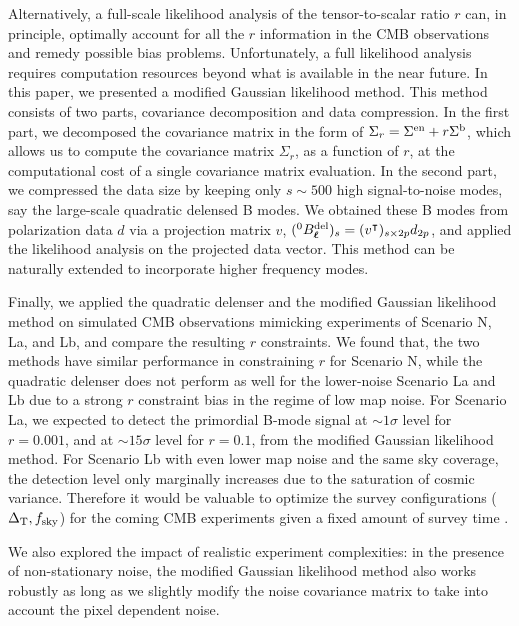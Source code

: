 \documentclass[iop,apj, numberedappendix]{emulateapj}
\newcommand*\Bell{\ensuremath{\boldsymbol\ell}}
\begin{document}
Alternatively,  a full-scale likelihood analysis of the tensor-to-scalar ratio $r$ can,
in principle, optimally account for all the $r$ information in the CMB observations and
remedy possible bias problems.
Unfortunately, a full likelihood analysis requires computation resources beyond
what is available in the near future.
In this paper, we presented a modified Gaussian likelihood method.
This method consists of two parts, covariance decomposition and data compression.
In the first part, we decomposed the covariance matrix
in the form of $\Sigma_r = \Sigma^{\rm en} + r \Sigma^{\rm b}$,
which allows us to compute the covariance matrix $\Sigma_r$, as a function of $r$, at the computational cost
of a single covariance matrix evaluation.
In the second part, we compressed the data size by keeping only $s\sim 500$
high signal-to-noise modes, say the large-scale quadratic delensed B modes.
We obtained these B modes from polarization data $d$ via a projection matrix $v$,
$(^0B^{\rm del}_{\Bell})_s = (v^\intercal)_{s\times 2p} d_{2p}$,
and applied the likelihood analysis on the projected data vector.
This method can be naturally extended to incorporate higher frequency modes.

Finally, we applied the quadratic delenser and
the modified Gaussian likelihood method on simulated CMB observations mimicking experiments of
Scenario N, La, and Lb, and compare the resulting $r$ constraints.
We found that, the two methods have similar performance in constraining $r$
for Scenario N, while the quadratic delenser does not perform
as well for the lower-noise Scenario La and Lb due to a strong $r$ constraint bias
in the regime of low map noise. For Scenario La, we expected to detect the
primordial B-mode signal at $\sim 1 \sigma$ level for $r=0.001$, and at $\sim 15 \sigma$ level for $r=0.1$,
from the modified Gaussian likelihood method.
For Scenario Lb with even lower map noise and the same sky coverage,
the detection level only marginally increases due to the saturation of cosmic variance.
Therefore it would be valuable to optimize the survey configurations (${\Delta_{\rm T}, f_{\rm sky}}$)
for the coming CMB experiments given a fixed amount of survey time \citep{s42016}.

We also explored the impact of realistic experiment complexities:
in the presence of non-stationary noise, the modified Gaussian likelihood method also works robustly
as long as we slightly modify the noise covariance matrix to take into account the pixel dependent noise.
\end{document}
